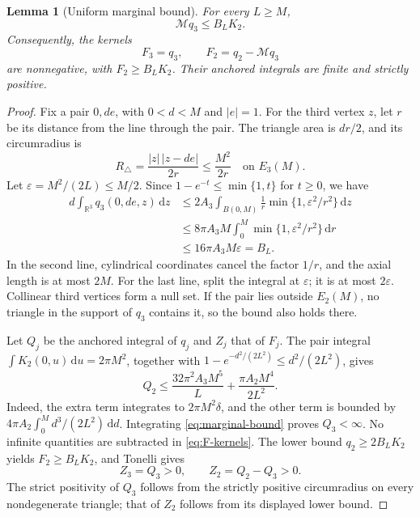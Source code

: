 \documentclass[11pt,a4paper]{article}
\numberwithin{equation}{section}
\newtheorem{lemma}[theorem]{Lemma}
\theoremstyle{definition}
\theoremstyle{remark}
\newcommand{\R}{\mathbb R}
\newcommand{\dd}{\,\mathrm d}
\newcommand{\Mop}{\mathcal M}
\begin{document}
\begin{lemma}[Uniform marginal bound]\label{lem:deficit}
For every $L\geq M$,
\begin{equation}
 \Mop q_3\leq B_LK_2.
 \label{eq:marginal-bound}
\end{equation}
Consequently, the kernels
\begin{equation}
 F_3=q_3,\qquad F_2=q_2-\Mop q_3
 \label{eq:F-kernels}
\end{equation}
are nonnegative, with $F_2\geq B_LK_2$. Their anchored integrals are
finite and strictly positive.
\end{lemma}
\begin{proof}
Fix a pair $0,de$, with $0<d<M$ and $|e|=1$. For the third vertex $z$,
let $r$ be its distance from the line through the pair. The triangle area
is $dr/2$, and its circumradius is
\begin{equation}
 R_\triangle=\frac{|z|\,|z-de|}{2r}\leq\frac{M^2}{2r}
 \quad\text{on }E_3(M).
 \label{eq:circumradius-bound}
\end{equation}
Let $\varepsilon=M^2/(2L)\leq M/2$. Since
$1-e^{-t}\leq\min\{1,t\}$ for $t\geq0$, we have
\begin{align*}
 d\int_{\R^3}q_3(0,de,z)\dd z
 &\leq2A_3\int_{B(0,M)}\frac1r
                    \min\{1,\varepsilon^2/r^2\}\dd z\\
 &\leq8\pi A_3M\int_0^M\min\{1,\varepsilon^2/r^2\}\dd r\\
 &\leq16\pi A_3M\varepsilon=B_L.
\end{align*}
In the second line, cylindrical coordinates cancel the factor $1/r$,
and the axial length is at most $2M$. For the last line, split the
integral at $\varepsilon$; it is at most $2\varepsilon$. Collinear third
vertices form a null set. If the pair lies outside $E_2(M)$, no triangle
in the support of $q_3$ contains it, so the bound also holds there.

Let $Q_j$ be the anchored integral of $q_j$ and $Z_j$ that of $F_j$.
The pair integral $\int K_2(0,u)\dd u=2\pi M^2$, together with
$1-e^{-d^2/(2L^2)}\leq d^2/(2L^2)$, gives
\begin{equation}
 Q_2\leq\frac{32\pi^2A_3M^5}{L}
              +\frac{\pi A_2M^4}{2L^2}.
 \label{eq:Q2-bound}
\end{equation}
Indeed, the extra term integrates to $2\pi M^2\delta$, and the other
term is bounded by
$4\pi A_2\int_0^M d^3/(2L^2)\dd d$.
Integrating \eqref{eq:marginal-bound} proves $Q_3<\infty$.
No infinite quantities are subtracted in \eqref{eq:F-kernels}.
The lower bound $q_2\geq2B_LK_2$ yields
$F_2\geq B_LK_2$, and Tonelli gives
\begin{equation}
 Z_3=Q_3>0,\qquad Z_2=Q_2-Q_3>0.
 \label{eq:ZQ}
\end{equation}
The strict positivity of $Q_3$ follows from the strictly positive
circumradius on every nondegenerate triangle; that of $Z_2$ follows from
its displayed lower bound.
\end{proof}
\end{document}
